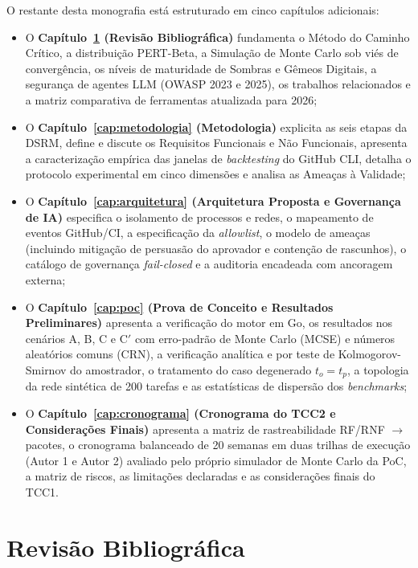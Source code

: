 \documentclass[12pt,openany,oneside,a4paper,english,brazilian,sumario=tradicional]{abntex2}
\begin{document}
O restante desta monografia está estruturado em cinco capítulos adicionais:
\begin{itemize}
  \item O \textbf{Capítulo~\ref{cap:revisao} (Revisão Bibliográfica)} fundamenta o Método do Caminho Crítico, a distribuição PERT-Beta, a Simulação de Monte Carlo sob viés de convergência, os níveis de maturidade de Sombras e Gêmeos Digitais, a segurança de agentes LLM (OWASP 2023 e 2025), os trabalhos relacionados e a matriz comparativa de ferramentas atualizada para 2026;
  \item O \textbf{Capítulo~\ref{cap:metodologia} (Metodologia)} explicita as seis etapas da DSRM, define e discute os Requisitos Funcionais e Não Funcionais, apresenta a caracterização empírica das janelas de \textit{backtesting} do GitHub CLI, detalha o protocolo experimental em cinco dimensões e analisa as Ameaças à Validade;
  \item O \textbf{Capítulo~\ref{cap:arquitetura} (Arquitetura Proposta e Governança de IA)} especifica o isolamento de processos e redes, o mapeamento de eventos GitHub/CI, a especificação da \textit{allowlist}, o modelo de ameaças (incluindo mitigação de persuasão do aprovador e contenção de rascunhos), o catálogo de governança \textit{fail-closed} e a auditoria encadeada com ancoragem externa;
  \item O \textbf{Capítulo~\ref{cap:poc} (Prova de Conceito e Resultados Preliminares)} apresenta a verificação do motor em Go, os resultados nos cenários A, B, C e C$'$ com erro-padrão de Monte Carlo (MCSE) e números aleatórios comuns (CRN), a verificação analítica e por teste de Kolmogorov-Smirnov do amostrador, o tratamento do caso degenerado $t_o=t_p$, a topologia da rede sintética de 200 tarefas e as estatísticas de dispersão dos \textit{benchmarks};
  \item O \textbf{Capítulo~\ref{cap:cronograma} (Cronograma do TCC2 e Considerações Finais)} apresenta a matriz de rastreabilidade RF/RNF $\rightarrow$ pacotes, o cronograma balanceado de 20 semanas em duas trilhas de execução (Autor 1 e Autor 2) avaliado pelo próprio simulador de Monte Carlo da PoC, a matriz de riscos, as limitações declaradas e as considerações finais do TCC1.
\end{itemize}

\chapter{Revisão Bibliográfica}\label{cap:revisao}
\end{document}
